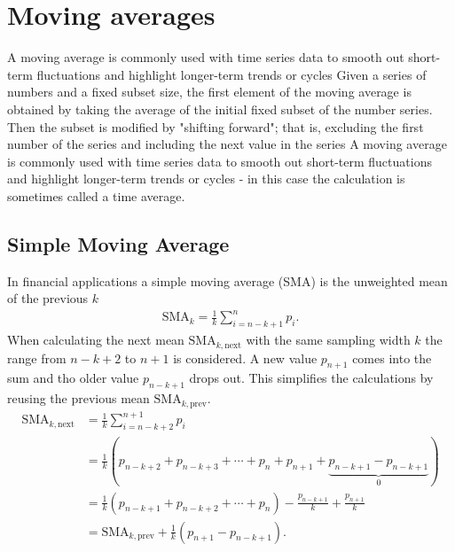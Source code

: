 \documentclass[letterpaper, 11pt]{article}
\newcommand{\1}{\mathds{1}}		%
\theoremstyle{definition}
\begin{document}
    \pagebreak 
    \section{Moving averages}
    \bigbreak \noindent 
    A moving average is commonly used with time series data to smooth out short-term fluctuations and highlight longer-term trends or cycles
    \bigbreak \noindent 
    Given a series of numbers and a fixed subset size, the first element of the moving average is obtained by taking the average of the initial fixed subset of the number series. Then the subset is modified by "shifting forward"; that is, excluding the first number of the series and including the next value in the series
    \bigbreak \noindent 
    A moving average is commonly used with time series data to smooth out short-term fluctuations and highlight longer-term trends or cycles - in this case the calculation is sometimes called a time average.

    \pagebreak 
    \subsection{Simple Moving Average}
    \bigbreak \noindent 
    In financial applications a simple moving average (SMA) is the unweighted mean of the previous $k$
    \begin{align*}
        \text{SMA}_{k} = \frac{1}{k}\sum_{i = n -k+1}^{n} p_{i}
    .\end{align*}
    When calculating the next mean $\text{SMA}_{k, \text{next}}$ with the same sampling width $k$ the range from $n-k+2$ to $n+1$ is considered. A new value $p_{n+1}$ comes into the sum and tho older value $p_{n-k+1}$ drops out. This simplifies the calculations by reusing the previous mean $\text{SMA}_{k,\text{prev}}$.
    \begin{align*}
        \text{SMA}_{k,\text{next}} &= \frac{1}{k}\sum_{i=n-k+2}^{n+1}p_{i} \\
                                   &= \frac{1}{k}\left(p_{n-k+2} + p_{n-k+3} + \cdots + p_{n} + p_{n+1} + \underbrace{p_{n-k+1} -p_{n-k+1}}_{0}\right) \\
                                   &= \frac{1}{k}\left(p_{n-k+1} + p_{n-k+2} + \cdots + p_{n}\right) - \frac{p_{n-k+1}}{k} + \frac{p_{n+1}}{k} \\
                                   &= \text{SMA}_{k,\text{prev}} + \frac{1}{k}\left(p_{n+1} -p_{n-k+1}\right)
    .\end{align*}
\end{document}
